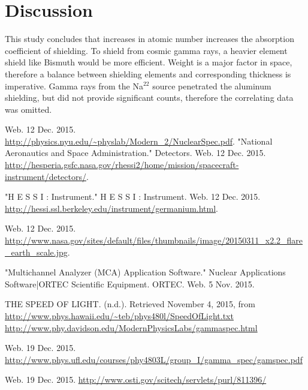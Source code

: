 \documentclass[aps,prl,twocolumn,superscriptaddress,nofootinbib]{revtex4-1}
\begin{document}
\section{Discussion}

This study concludes that increases in atomic number increases the absorption coefficient of shielding. To shield from cosmic gamma rays, a heavier element shield like Bismuth would be more efficient. Weight is a major factor in space, therefore a balance between shielding elements and corresponding thickness is imperative. Gamma rays from the Na$^{22}$ source penetrated the aluminum shielding, but did not provide significant counts, therefore the correlating data was omitted.


\setlength{\parindent}{0cm}

\begin{thebibliography}{99}  %

 Web. 12 Dec. 2015. \url{http://physics.nyu.edu/~physlab/Modern_2/NuclearSpec.pdf}.     %
 "National Aeronautics and Space Administration." Detectors. Web. 12 Dec. 2015. \url{http://hesperia.gsfc.nasa.gov/rhessi2/home/mission/spacecraft-instrument/detectors/}.

 "H E S S I : Instrument." H E S S I : Instrument. Web. 12 Dec. 2015. \url{http://hessi.ssl.berkeley.edu/instrument/germanium.html}.

 Web. 12 Dec. 2015. \url{http://www.nasa.gov/sites/default/files/thumbnails/image/20150311_x2.2_flare_earth_scale.jpg}.

 "Multichannel Analyzer (MCA) Application Software." Nuclear Applications Software|ORTEC Scientific Equipment. ORTEC. Web. 5 Nov. 2015.

 THE SPEED OF LIGHT. (n.d.). Retrieved November 4, 2015, from \url{http://www.phys.hawaii.edu/~teb/phys480l/SpeedOfLight.txt  http://www.phy.davidson.edu/ModernPhysicsLabs/gammaspec.html}

 Web. 19 Dec. 2015. \url{http://www.phys.ufl.edu/courses/phy4803L/group_I/gamma_spec/gamspec.pdf}

 Web. 19 Dec. 2015. \url{http://www.osti.gov/scitech/servlets/purl/811396/}



\end{thebibliography}
\end{document}
